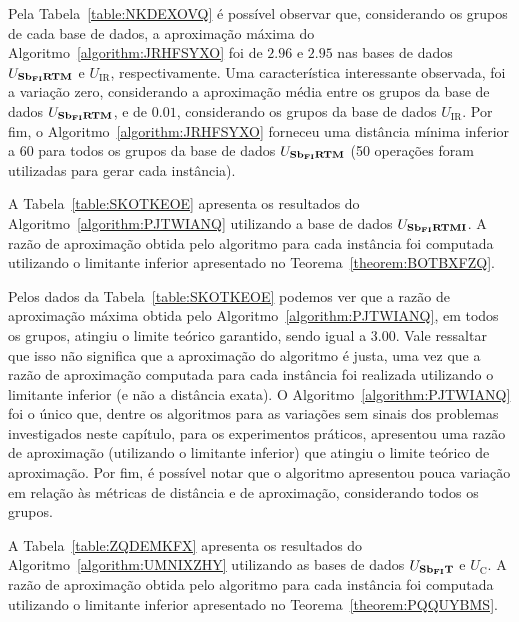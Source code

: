 

Pela Tabela~\ref{table:NKDEXOVQ} é possível observar que, considerando os grupos de cada base de dados, a aproximação máxima do Algoritmo~\ref{algorithm:JRHFSYXO} foi de $2.96$ e $2.95$ nas bases de dados $U_{\textbf{Sb\textsubscript{FI}RTM}}{}$ e $U_{\text{IR}}$, respectivamente. Uma característica interessante observada, foi a variação zero, considerando a aproximação média entre os grupos da base de dados $U_{\textbf{Sb\textsubscript{FI}RTM}}{}$, e de $0.01$, considerando os grupos da base de dados $U_{\text{IR}}$. Por fim, o Algoritmo~\ref{algorithm:JRHFSYXO} forneceu uma distância mínima inferior a $60$ para todos os grupos da base de dados $U_{\textbf{Sb\textsubscript{FI}RTM}}{}$ (50 operações foram utilizadas para gerar cada instância).

A Tabela~\ref{table:SKOTKEOE} apresenta os resultados do Algoritmo~\ref{algorithm:PJTWIANQ} utilizando a base de dados $U_{\textbf{Sb\textsubscript{FI}RTMI}}{}$. A razão de aproximação obtida pelo algoritmo para cada instância foi computada utilizando o limitante inferior apresentado no Teorema~\ref{theorem:BOTBXFZQ}.



Pelos dados da Tabela~\ref{table:SKOTKEOE} podemos ver que a razão de aproximação máxima obtida pelo Algoritmo~\ref{algorithm:PJTWIANQ}, em todos os grupos, atingiu o limite teórico garantido, sendo igual a $3.00$. Vale ressaltar que isso não significa que a aproximação do algoritmo é justa, uma vez que a razão de aproximação computada para cada instância foi realizada utilizando o limitante inferior (e não a distância exata). O Algoritmo~\ref{algorithm:PJTWIANQ} foi o único que, dentre os algoritmos para as variações sem sinais dos problemas investigados neste capítulo, para os experimentos práticos, apresentou uma razão de aproximação (utilizando o limitante inferior) que atingiu o limite teórico de aproximação. Por fim, é possível notar que o algoritmo apresentou pouca variação em relação às métricas de distância e de aproximação, considerando todos os grupos.

A Tabela~\ref{table:ZQDEMKFX} apresenta os resultados do Algoritmo~\ref{algorithm:UMNIXZHY} utilizando as bases de dados $U_{\textbf{Sb\textsubscript{FI}T}}{}$ e $U_{\text{C}}$. A razão de aproximação obtida pelo algoritmo para cada instância foi computada utilizando o limitante inferior apresentado no Teorema~\ref{theorem:PQQUYBMS}.



